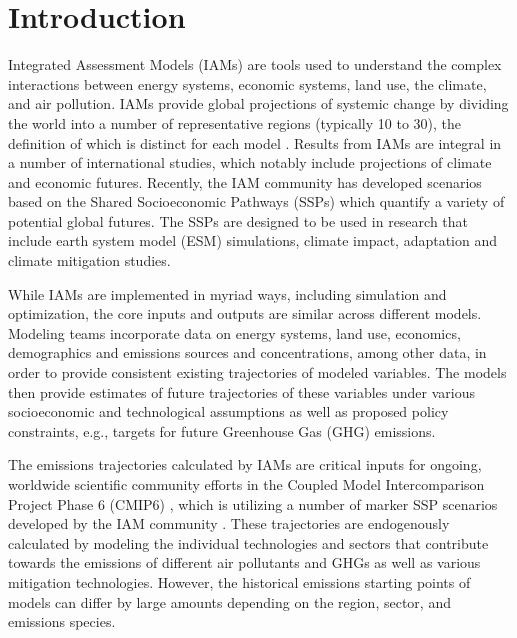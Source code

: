 \section{Introduction}

Integrated Assessment Models (IAMs) are tools used to understand the complex
interactions between energy systems, economic systems, land use, the climate,
and air pollution. IAMs provide global projections of
systemic change by dividing the world into a number of representative regions
(typically 10 to 30), the definition of which is distinct for each model
\cite{krey_global_2014}. Results from IAMs are integral in a number of
international studies, which notably include projections of climate and economic
futures. Recently, the IAM community has developed scenarios based on the Shared
% 
% 
Socioeconomic Pathways (SSPs) \cite{van_vuuren_energy_2017, fricko_marker_2017,
  fujimori_ssp3:_2017, calvin_ssp4:_2017, kriegler_fossil-fueled_2017} which
quantify a variety of potential global futures. The SSPs are  designed
to be used in  research that include earth system
model (ESM) simulations, climate impact, adaptation and climate mitigation
studies. 

While IAMs are implemented in myriad ways, including simulation and
optimization, the core inputs and outputs  are similar across different
models. Modeling teams incorporate  data on energy systems, land
use, economics, demographics and emissions sources and concentrations, among other
data, in order to provide consistent existing trajectories of modeled
variables. The models then provide estimates of future trajectories of these
variables under various socioeconomic and technological assumptions as well as
proposed policy constraints, e.g., targets for future Greenhouse Gas (GHG)
emissions.

The emissions trajectories calculated by IAMs are critical inputs for ongoing,
worldwide scientific community efforts in the Coupled Model Intercomparison
Project Phase 6 (CMIP6) \cite{eyring_overview_2016}, which is utilizing a number
of marker SSP scenarios developed by the IAM community
\cite{oneill_scenario_2016}. These trajectories are endogenously calculated by
modeling the individual technologies and sectors that contribute towards the
emissions of different air pollutants and GHGs as well as various mitigation
technologies. However, the historical emissions starting points of  models can differ by
large amounts depending on the region, sector, and emissions species.


